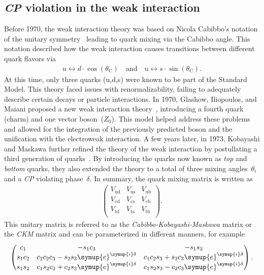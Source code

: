 \subsection{\textit{CP} violation in the weak interaction}
\label{sec:cpv}
Before 1970, the weak interaction theory was based on Nicola Cabibbo's notation of the unitary symmetry~\cite{Cabibbo_paper} leading to quark mixing via 
the Cabibbo angle. This notation described how the weak interaction causes transitions between different quark flavors via  
\begin{align*}
    u \leftrightarrow d\cdot\cos(\theta_{\mathrm{C}}) \quad \text{and} \quad u \leftrightarrow s\cdot\sin(\theta_{\mathrm{C}}).
\end{align*}
At this time, only three quarks (u,d,s) were known to be part of the Standard Model.
This theory faced issues with renormalizability, failing to adequately describe certain decays or particle interactions. 
In 1970, Glashow, Iliopoulos, and Maiani proposed a new weak interaction theory~\cite{GIM_paper}, introducing a fourth quark (charm) and one vector boson~($Z_0$). 
This model helped address these problems and allowed for the integration of the previously predicted boson and the unification with the electroweak interaction.
A few years later, in 1973, Kobayashi and Maskawa further refined the theory of the weak interaction by postullating a third generation of quarks~\cite{KM_paper}.
By introducing the quarks now known as \textit{top} and \textit{bottom} quarks, they also extended the theory to a total of three mixing angles~$\theta_i$ and a \textit{CP}
violating phase~$\delta$. In summary, the quark mixing matrix is written as
\begin{align*}
    \begin{pmatrix}
        V_{\mathrm{ud}} & V_{\mathrm{us}} & V_{\mathrm{ub}} \\
        V_{\mathrm{cd}} & V_{\mathrm{cs}} & V_{\mathrm{cb}} \\
        V_{\mathrm{td}} & V_{\mathrm{ts}} & V_{\mathrm{tb}} \\
    \end{pmatrix}.
\end{align*}
This unitary matrix is referred to as the \textit{Cabibbo-Kobayashi-Maskawa} matrix or the \textit{CKM} matrix and can be parameterized in different manners, 
for example 
\begin{align*}
    \begin{pmatrix}
        c_1 & -s_1c_3 & -s_1s_3 \\
        s_1c_2 & c_2c_2c_3 -s _2s_3\symup{e}^{\symup{i}\delta} & c_1c_2s_3 + s_2c_3\symup{e}^{\symup{i}\delta} \\
        s_1s_2 & c_1s_2c_3 + c_2s_3\symup{e}^{\symup{i}\delta} & c_1s_2s_3 - c_2c_3\symup{e}^{\symup{i}\delta} \\
    \end{pmatrix}.
\end{align*}
